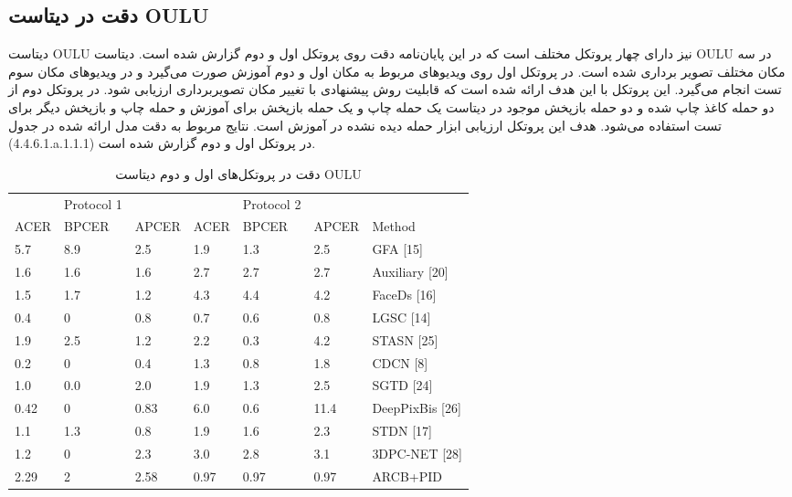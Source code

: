 \subsection{دقت در دیتاست OULU}
دیتاست OULU نیز دارای چهار پروتکل مختلف است که در این پایان‌نامه دقت روی پروتکل اول و دوم گزارش شده است. 
دیتاست OULU در سه مکان مختلف تصویر برداری شده است. در پروتکل اول روی ویدیوهای مربوط به مکان اول و دوم آموزش صورت می‌گیرد و در ویدیوهای مکان سوم تست انجام می‌گیرد. این پروتکل با این هدف ارائه شده است که قابلیت روش پیشنهادی با تغییر مکان تصویربرداری ارزیابی شود. 
در پروتکل دوم از دو حمله کاغذ چاپ شده و دو حمله بازپخش موجود در دیتاست یک حمله چاپ و یک حمله بازپخش برای آموزش و حمله چاپ و بازپخش دیگر برای تست استفاده می‌شود. هدف این پروتکل ارزیابی ابزار حمله دیده نشده در آموزش است. نتایج مربوط به دقت مدل ارائه شده در جدول (4.4.6.1.a.1.1.1) در پروتکل اول و دوم گزارش شده است.
\begin{table}[ht]
	\caption{دقت در پروتکل‌های اول و دوم دیتاست OULU}
	\label{tab:oulu}
	\centering
	\onehalfspacing
	\begin{tabular}{lllllll}
     & Protocol 				1 &       &      & Protocol 				2 &       &                         \\
ACER & BPCER          & APCER & ACER & BPCER          & APCER & Method                  \\
5.7  & 8.9            & 2.5   & 1.9  & 1.3            & 2.5   & GFA 				{[}15{]}        \\
1.6  & 1.6            & 1.6   & 2.7  & 2.7            & 2.7   & Auxiliary 				{[}20{]}  \\
1.5  & 1.7            & 1.2   & 4.3  & 4.4            & 4.2   & FaceDs 				{[}16{]}     \\
0.4  & 0              & 0.8   & 0.7  & 0.6            & 0.8   & LGSC 				{[}14{]}       \\
1.9  & 2.5            & 1.2   & 2.2  & 0.3            & 4.2   & STASN 				{[}25{]}      \\
0.2  & 0              & 0.4   & 1.3  & 0.8            & 1.8   & CDCN 				{[}8{]}        \\
1.0  & 0.0            & 2.0   & 1.9  & 1.3            & 2.5   & SGTD 				{[}24{]}       \\
0.42 & 0              & 0.83  & 6.0  & 0.6            & 11.4  & DeepPixBis 				{[}26{]} \\
1.1  & 1.3            & 0.8   & 1.9  & 1.6            & 2.3   & STDN 				{[}17{]}       \\
1.2  & 0              & 2.3   & 3.0  & 2.8            & 3.1   & 3DPC-NET 				{[}28{]}   \\
2.29 & 2              & 2.58  & 0.97 & 0.97           & 0.97  & ARCB+PID \\              
		\hline         
	\end{tabular}
\end{table}

